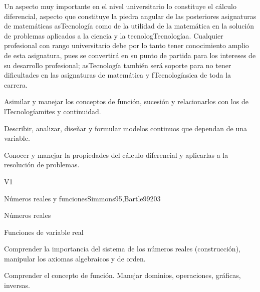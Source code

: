 \begin{syllabus}


\begin{justification}
Un aspecto muy importante en el nivel universitario lo constituye el cálculo diferencial,  aspecto que constituye la piedra angular de las posteriores asignaturas de matemáticas asTecnología como de la utilidad de la matemática en la solución de problemas aplicados a la ciencia y la tecnologTecnologíaa. Cualquier profesional con rango universitario debe por lo tanto tener conocimiento amplio de esta asignatura, pues se convertirá en su punto de partida para los intereses de su desarrollo profesional; asTecnología también será soporte para no tener dificultades en las asignaturas de matemática y fTecnologíasica de toda la carrera.
\end{justification}

\begin{goals}
\item Asimilar y manejar los conceptos de función, sucesión y relacionarlos con los de lTecnologíamites y continuidad.
\item Describir, analizar, diseñar y formular modelos continuos que dependan de una variable.
\item Conocer y manejar la propiedades del cálculo diferencial y aplicarlas a la resolución de problemas.
\end{goals}

\begin{outcomes}{V1}
   \item {}
   \item {}
   \item {}
\end{outcomes}

\begin{unit}{Números reales y funciones}{}{Simmons95,Bartle99}{20}{3}
   \begin{topics}
      \item Números reales
      \item Funciones de variable real
   \end{topics}

   \begin{learningoutcomes}
      \item Comprender la importancia del sistema de los números reales (construcción), manipular los axiomas algebraicos y de orden.
      \item Comprender el concepto de función. Manejar dominios, operaciones, gráficas, inversas.
      \end{learningoutcomes}
\end{unit}


\end{syllabus}
